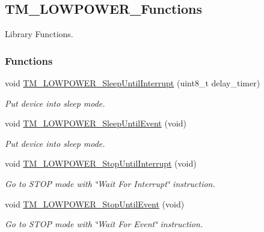 \hypertarget{group___t_m___l_o_w_p_o_w_e_r___functions}{}\subsection{T\+M\+\_\+\+L\+O\+W\+P\+O\+W\+E\+R\+\_\+\+Functions}
\label{group___t_m___l_o_w_p_o_w_e_r___functions}


Library Functions.  


\subsubsection*{Functions}
\begin{DoxyCompactItemize}
\item 
void \hyperlink{group___t_m___l_o_w_p_o_w_e_r___functions_gaabe385d1398fe280b93db08bd615c966}{T\+M\+\_\+\+L\+O\+W\+P\+O\+W\+E\+R\+\_\+\+Sleep\+Until\+Interrupt} (uint8\+\_\+t delay\+\_\+timer)
\begin{DoxyCompactList}\small\item\em Put device into sleep mode. \end{DoxyCompactList}\item 
void \hyperlink{group___t_m___l_o_w_p_o_w_e_r___functions_gaf92d2da64f91b05c1f3638903d597e74}{T\+M\+\_\+\+L\+O\+W\+P\+O\+W\+E\+R\+\_\+\+Sleep\+Until\+Event} (void)
\begin{DoxyCompactList}\small\item\em Put device into sleep mode. \end{DoxyCompactList}\item 
void \hyperlink{group___t_m___l_o_w_p_o_w_e_r___functions_gaacd221196935edc76adb733354d7b095}{T\+M\+\_\+\+L\+O\+W\+P\+O\+W\+E\+R\+\_\+\+Stop\+Until\+Interrupt} (void)
\begin{DoxyCompactList}\small\item\em Go to S\+T\+O\+P mode with \char`\"{}\+Wait For Interrupt\char`\"{} instruction. \end{DoxyCompactList}\item 
void \hyperlink{group___t_m___l_o_w_p_o_w_e_r___functions_gac5f4965b4e018c7a0fba6279a639017a}{T\+M\+\_\+\+L\+O\+W\+P\+O\+W\+E\+R\+\_\+\+Stop\+Until\+Event} (void)
\begin{DoxyCompactList}\small\item\em Go to S\+T\+O\+P mode with \char`\"{}\+Wait For Event\char`\"{} instruction. \end{DoxyCompactList}\item 

\end{DoxyCompactItemize}
